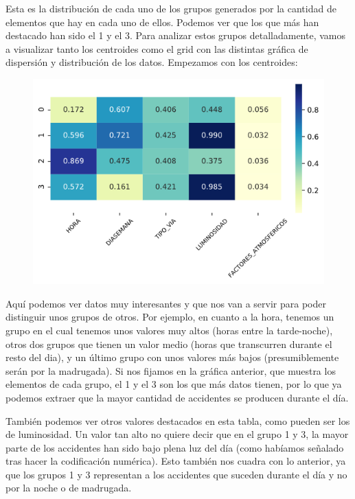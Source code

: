\documentclass[11pt,a4paper]{article}
\begin{document}
Esta es la distribución de cada uno de los grupos generados por la cantidad de elementos que hay en cada uno de ellos. Podemos ver
que los que más han destacado han sido el 1 y el 3. Para analizar estos grupos detalladamente, vamos a visualizar tanto los centroides
como el grid con las distintas gráfica de dispersión y distribución de los datos. Empezamos con los centroides:

\begin{figure}[H]
    \centering
    \includegraphics[scale=0.5]{img/centroides-and.png}
\end{figure}

Aquí podemos ver datos muy interesantes y que nos van a servir para poder distinguir unos grupos de otros. Por ejemplo, en cuanto
a la hora, tenemos un grupo en el cual tenemos unos valores muy altos (horas entre la tarde-noche), otros dos grupos que tienen
un valor medio (horas que transcurren durante el resto del dia), y un último grupo con unos valores más bajos (presumiblemente serán
por la madrugada). Si nos fijamos en la gráfica anterior, que muestra los elementos de cada grupo, el 1 y el 3 son los que más
datos tienen, por lo que ya podemos extraer que la mayor cantidad de accidentes se producen durante el día.

También podemos ver otros valores destacados en esta tabla, como pueden ser los de luminosidad. Un valor tan alto no quiere decir
que en el grupo 1 y 3, la mayor parte de los accidentes han sido bajo plena luz del día (como habíamos señalado tras hacer la
codificación numérica). Esto también nos cuadra con lo anterior, ya que los grupos 1 y 3 representan a los accidentes que suceden
durante el día y no por la noche o de madrugada.
\end{document}
